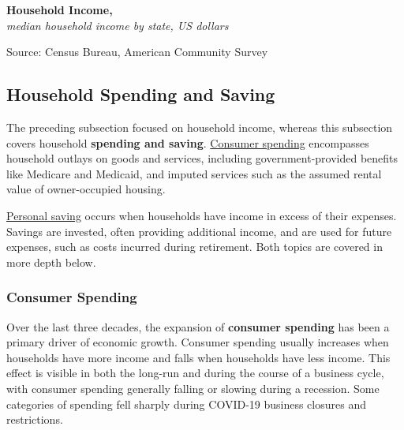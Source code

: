 \documentclass{report}
\newcommand{\tbllink}[1]{\href{https://raw.githubusercontent.com/bdecon/US-chartbook/master/chartbook/data/#1}{\faTable}}
\begin{document}
{\normalsize \textbf{Household Income, }\\
\footnotesize{\textit{median household income by state, US dollars}}
\vspace{-3mm}

\hspace{-5mm} 
\vspace{-6mm}

\begin{minipage}{1.0\textwidth} 
\footnotesize{Source: Census Bureau, American Community Survey} \hfill \tbllink{median_hh_inc_state.csv}
\end{minipage}
\newpage 
\begin{minipage}{1.0\textwidth}    
\subsection*{Household Spending and Saving}
\hypertarget{hhss}{\label{hhss}} 
\small The preceding subsection focused on household income, whereas this subsection covers household \textbf{spending and saving}. \href{https://www.bea.gov/data/consumer-spending/main}{Consumer spending} encompasses household outlays on goods and services, including government-provided benefits like Medicare and Medicaid, and imputed services such as the assumed rental value of owner-occupied housing.

\href{https://www.bea.gov/data/income-saving/personal-saving-rate}{Personal saving} occurs when households have income in excess of their expenses. Savings are invested, often providing additional income, and are used for future expenses, such as costs incurred during retirement. Both topics are covered in more depth below.
\vspace{1mm}

\subsubsection*{Consumer Spending}
\vspace{-1mm}

\small Over the last three decades, the expansion of \textbf{consumer spending} has been a primary driver of economic growth. Consumer spending usually increases when households have more income and falls when households have less income. This effect is visible in both the long-run and during the course of a business cycle, with consumer spending generally falling or slowing during a recession. Some categories of spending fell sharply during COVID-19 business closures and restrictions.


\end{minipage}}
\end{document}

